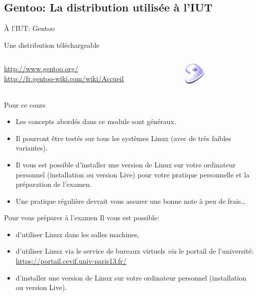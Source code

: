 \subsection{Gentoo: La distribution utilisée à l'IUT}
\begin{frame}{À l'IUT: Gentoo}
  \begin{block}{Une distribution téléchargeable}
    \begin{columns}
      \begin{column}{8cm}
        \url{http://www.gentoo.org/}\\
        \url{http://fr.gentoo-wiki.com/wiki/Accueil}
      \end{column}
      \begin{column}{3cm}
        \includegraphics[width=1cm]{img/s01/gentoo_logo.png}
      \end{column}
    \end{columns}
  \end{block}
  \begin{block}{Pour ce cours}
    \begin{itemize}
    \item Les concepts abordés dans ce module sont généraux.
    \item Il pourront être testés sur tous les systèmes Linux (avec de très faibles variantes).
    \item Il vous est possible d'installer une version de Linux sur votre ordinateur personnel (installation ou version Live) pour votre pratique personnelle et la préparation de l'examen.
    \item Une pratique régulière devrait vous assurer une bonne note à peu de frais\dots
    \end{itemize}
  \end{block}
  \begin{alertblock}{Pour vous préparer à l'examen}
    Il vous est possible:
    \begin{itemize}
    \item d'utiliser Linux dans les salles machines,
    \item d'utiliser Linux via le service de bureaux virtuels \textit{via} le portail de l'université:\\ \url{https://portail.cevif.univ-paris13.fr/}
    \item d'installer une version de Linux sur votre ordinateur personnel (installation ou version Live).
    \end{itemize}
  \end{alertblock}
\end{frame}
